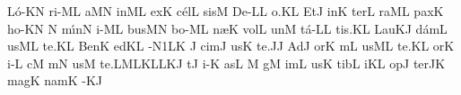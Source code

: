 

\gregorianFclef
{}
\Internote
\nosolesmescustos
\initiumgregorianum
{}%
\sgn L{\'o}-\pes KN\egn
\sgn ri-\clivis ML\egn
\sgn {}a{}\pes MN\egn
\spatium
\sgn {}in\clivis ML\egn
\spatium
\sgn {}ex\punctum K\egn
\sgn c{\'e}l\punctum L\egn
\sgn sis\punctum M\egn
\spatium
\sgn D{e}-\punctum L\augmentum L\egn
\sgn {}o{.}\punctum K\augmentum L\egn
\spatium
\divisiofinalis
\spatium
\sgn {}Et\punctum J\egn
\spatium
\sgn {}in\punctum K\egn
\spatium
\sgn t{e}r\punctum L\egn
\sgn ra{}\clivis ML\egn
\spatium
\sgn pax\punctum K\egn
\spatium
\sgn ho-\pes KN\egn
\custos N
\lineaproxima
\sgn m{\'\i}n\punctum N\egn
\sgn {}i-\clivis ML\egn
\sgn bus\pes MN\egn
\spatium
\divisiominima
\spatium
\sgn b{o}-\clivis ML\egn
\sgn n{\ae}{}\punctum K\egn
\spatium
\sgn vol\punctum L\egn
\sgn {}un\punctum M\egn
\sgn t{\'a}-\punctum L\augmentum L\egn
\sgn ti{s.}\punctum K\augmentum L\egn
\spatium
\divisiofinalis
\spatium
\sgn Lau\cephalicus KJ\egn
\sgn d{\'a}m\punctum L\egn
\sgn {}us\clivis ML\egn
\spatium
\sgn te.\punctum K\augmentum L\egn
\spatium
\divisiofinalis
\spatium
\sgn Ben\punctum K\egn
\sgn {}ed\pes KL\egn
\sgn {}{\'\i}-\episem N1\clivis LK\egn
\custos J
\lineaproxima
\sgn cim\punctum J\egn
\sgn {}us\punctum K\egn
\spatium
\sgn te.\punctum J\augmentum J\egn
\spatium
\divisiofinalis
\spatium
\sgn {}Ad\punctum J\egn
\sgn {}or\punctum K\egn
{}m\punctum L\egn
\sgn {}us\clivis ML\egn
\spatium
\sgn te.\punctum K\augmentum L\egn
\spatium
\divisiofinalis
\spatium
{}or\punctum K\egn
\sgn {}i-\punctum L\egn
{}c\punctum M\egn
{}m\punctum N\egn
\sgn {}us\punctum M\egn
\spatium
\sgn te.\pessubbipunctis LMLK\punctum L\clivis LK\augmentum J\egn
\spatium
\divisiofinalis
\spatium
{}t\punctum J\egn
\sgn {}i-\punctum K\egn
\sgn {}as\punctum L\egn
\spatium
\custos M
\lineaproxima
{}g\punctum M\egn
\sgn {}im\punctum L\egn
\sgn {}us\punctum K\egn
\spatium
\sgn t{i}b\punctum L\egn
\sgn {}i{}\punctum K\augmentum L\egn
\spatium
\divisiominima
\spatium
{}op\punctum J\egn
\sgn ter\epiphonus JK\egn
\spatium
\sgn m{a}g\punctum K\egn
\sgn nam\punctum K\egn
\spatium
{}-\clivis KJ\egn
